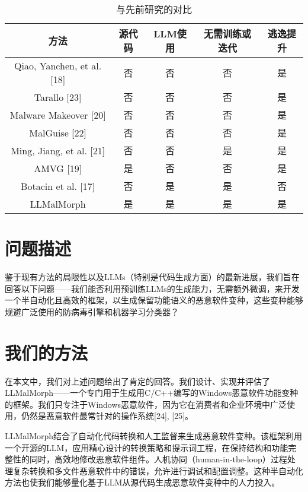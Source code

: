 \begin{table}[htbp]
	\centering
	\caption{与先前研究的对比}
	\label{tab:1.1}
	\begin{tabular*}{\textwidth}{@{\extracolsep{\fill}}ccccc}
		\toprule
		方法 & 源代码 & LLM使用 & 无需训练或迭代 & 逃逸提升 \\
		\midrule
		{Qiao, Yanchen, et al. [18]} & 否 & 否 & 否 & 是 \\
		{Tarallo [23]} & 否 & 否 & 否 & 是 \\
		{Malware Makeover [20]} & 否 & 否 & 否 & 是 \\
		{MalGuise [22]} & 否 & 否 & 否 & 是 \\
		{Ming, Jiang, et al. [21]} & 否 & 否 & 是 & 是 \\
		AMVG [19] & 是 & 否 & 否 & 是 \\
        Botacin et al. [17] & 否 & 是 & 是 & 否 \\
        LLMalMorph & 是 & 是 & 是 & 是 \\
		\bottomrule
	\end{tabular*}
\end{table}

\section{问题描述}
鉴于现有方法的局限性以及LLMs（特别是代码生成方面）的最新进展，我们旨在回答以下问题——我们能否利用预训练LLMs的生成能力，无需额外微调，来开发一个半自动化且高效的框架，以生成保留功能语义的恶意软件变种，这些变种能够规避广泛使用的防病毒引擎和机器学习分类器？

\section{我们的方法}
在本文中，我们对上述问题给出了肯定的回答。我们设计、实现并评估了LLMalMorph——一个专门用于生成用C/C++编写的Windows恶意软件功能变种的框架。我们只专注于Windows恶意软件，因为它在消费者和企业环境中广泛使用，仍然是恶意软件最常针对的操作系统[24], [25]。

LLMalMorph结合了自动化代码转换和人工监督来生成恶意软件变种。该框架利用一个开源的LLM，应用精心设计的转换策略和提示词工程，在保持结构和功能完整性的同时，高效地修改恶意软件组件。人机协同（human-in-the-loop）过程处理复杂转换和多文件恶意软件中的错误，允许进行调试和配置调整。这种半自动化方法也使我们能够量化基于LLM从源代码生成恶意软件变种中的人力投入。